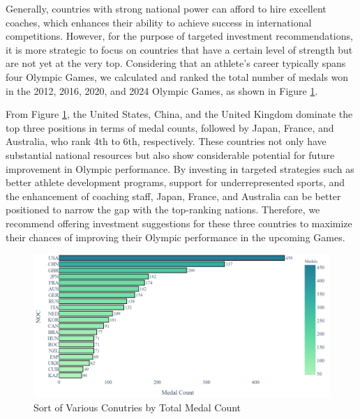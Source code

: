 \documentclass{mcmthesis}
\begin{document}
Generally, countries with strong national power can afford to hire excellent coaches, which enhances their ability to achieve success in international competitions. However, for the purpose of targeted investment recommendations, it is more strategic to focus on countries that have a certain level of strength but are not yet at the very top. Considering that an athlete's career typically spans four Olympic Games, we calculated and ranked the total number of medals won in the 2012, 2016, 2020, and 2024 Olympic Games, as shown in Figure \ref{fig:medal_count_by_noc}.

From Figure \ref{fig:medal_count_by_noc}, the United States, China, and the United Kingdom dominate the top three positions in terms of medal counts, followed by Japan, France, and Australia, who rank 4th to 6th, respectively. These countries not only have substantial national resources but also show considerable potential for future improvement in Olympic performance. By investing in targeted strategies such as better athlete development programs, support for underrepresented sports, and the enhancement of coaching staff, Japan, France, and Australia can be better positioned to narrow the gap with the top-ranking nations. Therefore, we recommend offering investment suggestions for these three countries to maximize their chances of improving their Olympic performance in the upcoming Games.

\begin{figure}[H]
	\centering
	\includegraphics[width=1\linewidth]{fig/Medal_Count_by_NOC.png}
	\caption{Sort of Various Conutries by Total Medal Count}
	\label{fig:medal_count_by_noc}
\end{figure}

\end{document}
